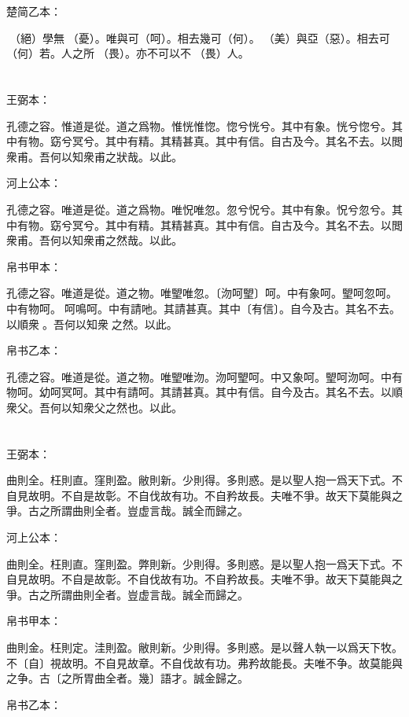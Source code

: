 \documentclass[a5paper]{ctexbook}
\begin{document}
    楚简乙本：

    󶴐（絕）學無𢝊（憂）。唯與可（呵）。相去幾可（何）。𡵂（美）與亞（惡）。相去可（何）若。人之所𥚸（畏）。亦不可以不𥚸（畏）人。

    \chapter{}
    王弼本：

    孔德之容。惟道是從。道之爲物。惟恍惟惚。惚兮恍兮。其中有象。恍兮惚兮。其中有物。窈兮冥兮。其中有精。其精甚真。其中有信。自古及今。其名不去。以閲衆甫。吾何以知衆甫之狀哉。以此。

    河上公本：

    孔德之容。唯道是從。道之爲物。唯怳唯忽。忽兮怳兮。其中有象。怳兮忽兮。其中有物。窈兮冥兮。其中有精。其精甚真。其中有信。自古及今。其名不去。以閲衆甫。吾何以知衆甫之然哉。以此。

    帛书甲本：

    孔德之容。唯道是從。道之物。唯朢唯忽。〔沕呵朢〕呵。中有象呵。朢呵忽呵。中有物呵。𣾧呵鳴呵。中有請吔。其請甚真。其中〔有信〕。自今及古。其名不去。以順衆𠇑。吾何以知衆𠇑之然。以此。

    帛书乙本：

    孔德之容。唯道是從。道之物。唯朢唯沕。沕呵朢呵。中又象呵。朢呵沕呵。中有物呵。幼呵冥呵。其中有請呵。其請甚真。其中有信。自今及古。其名不去。以順衆父。吾何以知衆父之然也。以此。

    \chapter{}
    王弼本：

    曲則全。枉則直。窪則盈。敝則新。少則得。多則惑。是以聖人抱一爲天下式。不自見故明。不自是故彰。不自伐故有功。不自矜故長。夫唯不爭。故天下莫能與之爭。古之所謂曲則全者。豈虚言哉。誠全而歸之。

    河上公本：

    曲則全。枉則直。窪則盈。弊則新。少則得。多則惑。是以聖人抱一爲天下式。不自見故明。不自是故彰。不自伐故有功。不自矜故長。夫唯不爭。故天下莫能與之爭。古之所謂曲則全者。豈虚言哉。誠全而歸之。

    帛书甲本：

    曲則金。枉則定。洼則盈。敝則新。少則得。多則惑。是以聲人執一以爲天下牧。不〔自〕視故明。不自見故章。不自伐故有功。弗矜故能長。夫唯不争。故莫能與之争。古〔之所胃曲全者。幾〕語才。誠金歸之。

    帛书乙本：
\end{document}
